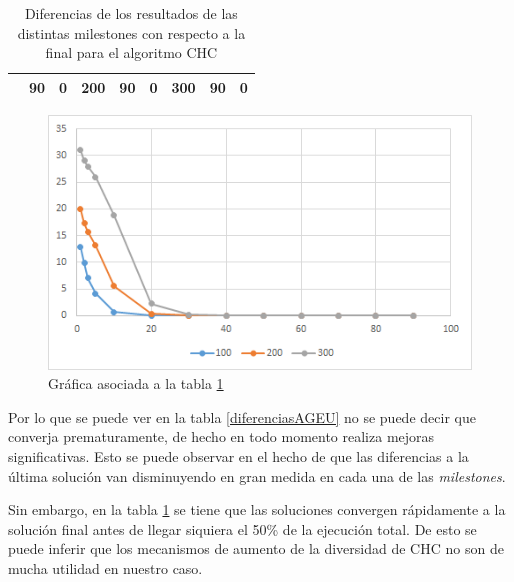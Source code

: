 \begin{table}[]
\begin{tabular}{|cclcclccl|}
\rowcolor[HTML]{DAE8FC} 
\multicolumn{1}{|c|}{\multirow{-13}{*}{\cellcolor[HTML]{FFFFC7}\textbf{100}}} & \multicolumn{1}{c|}{\cellcolor[HTML]{DAE8FC}90}        & \multicolumn{1}{l|}{\cellcolor[HTML]{DAE8FC}0}          & \multicolumn{1}{c|}{\multirow{-13}{*}{\cellcolor[HTML]{FFFFC7}\textbf{200}}} & \multicolumn{1}{c|}{\cellcolor[HTML]{DAE8FC}90}        & \multicolumn{1}{l|}{\cellcolor[HTML]{DAE8FC}0}          & \multicolumn{1}{c|}{\multirow{-13}{*}{\cellcolor[HTML]{FFFFC7}\textbf{300}}} & \multicolumn{1}{c|}{\cellcolor[HTML]{DAE8FC}90}        & 0          \\ \hline
\end{tabular}
\caption{\label{DiferenciasCHC}Diferencias de los resultados de las distintas milestones con respecto a la final para el algoritmo CHC}
\end{table}

\begin{figure}[h]
		\centering
		\includegraphics[scale=1]{imagenes/Experimental/DiferenciasCHC.png}
        \caption{Gráfica asociada a la tabla \ref{DiferenciasCHC}}
        \label{fig:DiferenciasCHC}
\end{figure}

Por lo que se puede ver en la tabla \ref{diferenciasAGEU} no se puede decir que converja prematuramente, de hecho en todo momento realiza mejoras significativas. 
Esto se puede observar en el hecho de que las diferencias a la última solución van disminuyendo en gran medida en cada una de las \textit{milestones}. 

Sin embargo, en la tabla \ref{DiferenciasCHC} se tiene que las soluciones convergen rápidamente a la solución final antes de llegar siquiera el 50\% de la ejecución total. 
De esto se puede inferir que los mecanismos de aumento de la diversidad de CHC no son de mucha utilidad en nuestro caso. 

